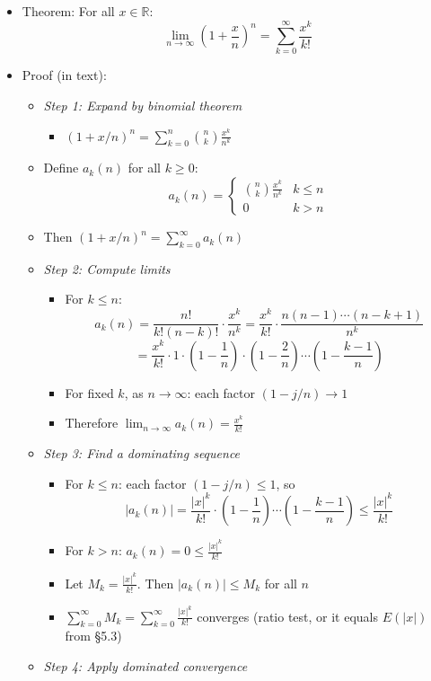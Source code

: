\documentclass[
  10pt,
  letterpaper,
]{scrbook}
\providecommand{\tightlist}{%
  \setlength{\itemsep}{0pt}\setlength{\parskip}{0pt}}
\begin{document}
\begin{itemize}
\tightlist
\item
  Theorem: For all \(x \in \mathbb{R}\):
  \[\lim_{n \to \infty} \left(1 + \frac{x}{n}\right)^n = \sum_{k=0}^{\infty} \frac{x^k}{k!}\]
\item
  Proof (in text):

  \begin{itemize}
  \tightlist
  \item
    \emph{Step 1: Expand by binomial theorem}

    \begin{itemize}
    \tightlist
    \item
      \((1 + x/n)^n = \sum_{k=0}^{n} \binom{n}{k} \frac{x^k}{n^k}\)
    \end{itemize}
  \item
    Define \(a_k(n)\) for all \(k \geq 0\):
    \[a_k(n) = \begin{cases} \binom{n}{k} \frac{x^k}{n^k} & k \leq n \\ 0 & k > n \end{cases}\]
  \item
    Then \((1 + x/n)^n = \sum_{k=0}^{\infty} a_k(n)\)
  \item
    \emph{Step 2: Compute limits}

    \begin{itemize}
    \tightlist
    \item
      For \(k \leq n\):
      \[a_k(n) = \frac{n!}{k!(n-k)!} \cdot \frac{x^k}{n^k} = \frac{x^k}{k!} \cdot \frac{n(n-1)\cdots(n-k+1)}{n^k}\]
      \[= \frac{x^k}{k!} \cdot 1 \cdot \left(1 - \frac{1}{n}\right) \cdot \left(1 - \frac{2}{n}\right) \cdots \left(1 - \frac{k-1}{n}\right)\]
    \item
      For fixed \(k\), as \(n \to \infty\): each factor
      \((1 - j/n) \to 1\)
    \item
      Therefore \(\lim_{n \to \infty} a_k(n) = \frac{x^k}{k!}\)
    \end{itemize}
  \item
    \emph{Step 3: Find a dominating sequence}

    \begin{itemize}
    \tightlist
    \item
      For \(k \leq n\): each factor \((1 - j/n) \leq 1\), so
      \[|a_k(n)| = \frac{|x|^k}{k!} \cdot \left(1 - \frac{1}{n}\right) \cdots \left(1 - \frac{k-1}{n}\right) \leq \frac{|x|^k}{k!}\]
    \item
      For \(k > n\): \(a_k(n) = 0 \leq \frac{|x|^k}{k!}\)
    \item
      Let \(M_k = \frac{|x|^k}{k!}\). Then \(|a_k(n)| \leq M_k\) for all
      \(n\)
    \item
      \(\sum_{k=0}^{\infty} M_k = \sum_{k=0}^{\infty} \frac{|x|^k}{k!}\)
      converges (ratio test, or it equals \(E(|x|)\) from §5.3)
    \end{itemize}
  \item
    \emph{Step 4: Apply dominated convergence}


\end{itemize}
\end{itemize}
\end{document}

